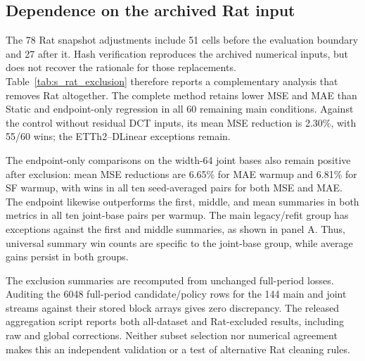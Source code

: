 \begin{table}[!tbp]
\caption{Expanding-prefix selection on the main 72 conditions. Entries are mean MSE reductions (\%) from Static in the indicated quarter. Prefix selection uses all earlier blocks; the oracle uses the scored quarter. Pool definitions match Table~\ref{tab:temporal_selection}.}
\label{tab:s_origins}
\centering

\end{table}

\subsection{Dependence on the archived Rat input}
The 78 Rat snapshot adjustments include 51 cells before the evaluation boundary and 27 after it. Hash verification reproduces the archived numerical inputs, but does not recover the rationale for those replacements. Table~\ref{tab:s_rat_exclusion} therefore reports a complementary analysis that removes Rat altogether. The complete method retains lower MSE and MAE than Static and endpoint-only regression in all 60 remaining main conditions. Against the control without residual DCT inputs, its mean MSE reduction is 2.30\%, with 55/60 wins; the ETTh2--DLinear exceptions remain.

The endpoint-only comparisons on the width-64 joint bases also remain positive after exclusion: mean MSE reductions are 6.65\% for MAE warmup and 6.81\% for SF warmup, with wins in all ten seed-averaged pairs for both MSE and MAE. The endpoint likewise outperforms the first, middle, and mean summaries in both metrics in all ten joint-base pairs per warmup. The main legacy/refit group has exceptions against the first and middle summaries, as shown in panel A. Thus, universal summary win counts are specific to the joint-base group, while average gains persist in both groups.

The exclusion summaries are recomputed from unchanged full-period losses. Auditing the 6048 full-period candidate/policy rows for the 144 main and joint streams against their stored block arrays gives zero discrepancy. The released aggregation script reports both all-dataset and Rat-excluded results, including raw and global corrections. Neither subset selection nor numerical agreement makes this an independent validation or a test of alternative Rat cleaning rules.

\begin{table}[!tbp]
\caption{Rat-exclusion sensitivity over the full period. Positive percentages are mean paired MSE/MAE reductions of the complete method relative to the named reference; Wins count lower losses before rounding. All corrections use global blending. Panel A averages 60 condition-wise reductions. Panels B/C use width-64 joint bases and average three-seed losses before computing reductions over ten dataset--backbone pairs. Fox and Panther are not included.}
\label{tab:s_rat_exclusion}
\centering

\end{table}

